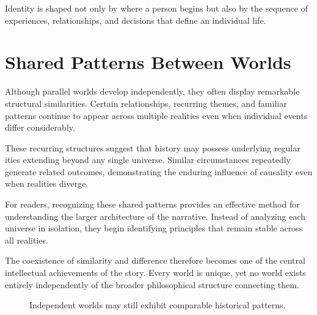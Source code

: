 \documentclass[12pt,oneside,openany]{book}
\begin{document}
\begin{tcolorbox}[colback=green!6,colframe=green!50!black,title=Key Concept]
Identity is shaped not only by where a person begins but also by the sequence
of experiences, relationships, and decisions that define an individual life.
\end{tcolorbox}

\section{Shared Patterns Between Worlds}

Although parallel worlds develop independently, they often display remarkable
structural similarities. Certain relationships, recurring themes, and familiar
patterns continue to appear across multiple realities even when individual
events differ considerably.

These recurring structures suggest that history may possess underlying regular
ities extending beyond any single universe. Similar circumstances repeatedly
generate related outcomes, demonstrating the enduring influence of causality
even when realities diverge.

For readers, recognizing these shared patterns provides an effective method for
understanding the larger architecture of the narrative. Instead of analyzing
each universe in isolation, they begin identifying principles that remain
stable across all realities.

The coexistence of similarity and difference therefore becomes one of the
central intellectual achievements of the story. Every world is unique, yet no
world exists entirely independently of the broader philosophical structure
connecting them.
\begin{figure}[H]
\centering
{}
\caption{Independent worlds may still exhibit comparable historical patterns.}
\end{figure}
\end{document}
